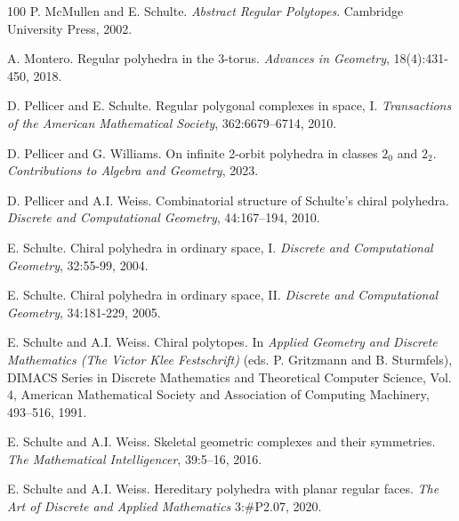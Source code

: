 \documentclass[12pt]{article}
\theoremstyle{definition}\newtheorem{definition}{Definition}[section]
\begin{document}
\begin{thebibliography}{100}
    P. McMullen and E. Schulte. \textit{Abstract Regular Polytopes}. Cambridge University Press, 2002.

    A. Montero. Regular polyhedra in the 3-torus. \textit{Advances in Geometry}, 18(4):431-450, 2018.

    D. Pellicer and E. Schulte. Regular polygonal complexes in space, I. \textit{Transactions of the American Mathematical Society},
    362:6679–6714, 2010.
  
    D. Pellicer and G. Williams. On infinite 2-orbit polyhedra in classes $2_0$ and $2_2$. \textit{Contributions to Algebra and Geometry}, 2023.

    D. Pellicer and A.I. Weiss. Combinatorial structure of Schulte’s chiral polyhedra. \textit{Discrete and Computational Geometry}, 44:167–194, 2010.


    E. Schulte. Chiral polyhedra in ordinary space, I. \textit{Discrete and Computational Geometry}, 32:55-99, 2004. 

    E. Schulte. Chiral polyhedra in ordinary space, II. \textit{Discrete and Computational Geometry}, 34:181-229, 2005.


    E. Schulte and A.I. Weiss. Chiral polytopes. In \textit{Applied Geometry and Discrete Mathematics (The Victor Klee Festschrift)} (eds. P. Gritzmann and B. Sturmfels), DIMACS Series in Discrete Mathematics and Theoretical Computer Science, Vol. 4, American Mathematical Society and Association of Computing Machinery, 493–516, 1991.
     
    E. Schulte and A.I. Weiss. Skeletal geometric complexes and their symmetries. \textit{The Mathematical Intelligencer}, 39:5–16, 2016.

    E. Schulte and A.I. Weiss. Hereditary polyhedra with planar regular faces. \textit{The Art of Discrete and Applied Mathematics} 3:\#P2.07, 2020.


\end{thebibliography}
\end{document}
